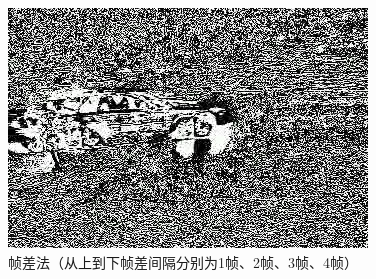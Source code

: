 \documentclass[a4paper]{ctexart}
\begin{document}
\begin{figure}[htbp]
\begin{minipage}[t]{0.2\textwidth}
	\end{minipage}
	\begin{minipage}[t]{0.2\textwidth}
		\centering
		\includegraphics[width=\textwidth]{figure/frames/sb3415.jpg}
	\end{minipage}
	\caption{帧差法（从上到下帧差间隔分别为1帧、2帧、3帧、4帧）}\label{figure:帧差法}
\end{figure}
\end{document}
